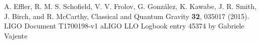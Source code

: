 \begin{thebibliography}{2}
 A. Effler, R. M. S. Schofield, V. V. Frolov, G. Gonz{\'{a}}lez, K. Kawabe, J. R. Smith, J. Birch, and R. McCarthy, Classical and Quantum Gravity \textbf{32}, 035017 (2015).
 LIGO Document T1700198-v1
 aLIGO LLO Logbook entry 45374 by Gabriele Vajente
\end{thebibliography}

